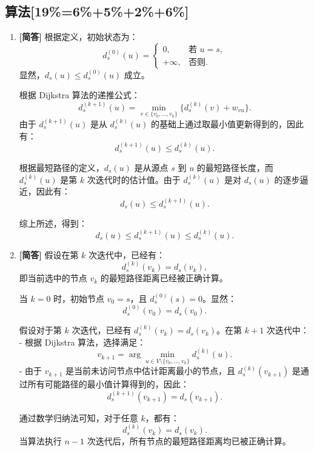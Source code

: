 \documentclass{article}
\begin{document}
\subsection{算法[19\%=6\%+5\%+2\%+6\%]}

\begin{enumerate}[label=(\alph*), start=3]
    \item \textbf{[简答]} %
    根据定义，初始状态为：
    \[
    d_s^{(0)}(u) =
    \begin{cases}
    	0, & \text{若 } u = s, \\
    	+\infty, & \text{否则}.
    \end{cases}
    \]
    显然，\( d_s(u) \leq d_s^{(0)}(u) \) 成立。
    
    根据 Dijkstra 算法的递推公式：
    \[
    d_s^{(k+1)}(u) = \min_{v \in \{v_0, \dots, v_k\}} \{ d_s^{(k)}(v) + w_{vu} \}.
    \]
    由于 \( d_s^{(k+1)}(u) \) 是从 \( d_s^{(k)}(u) \) 的基础上通过取最小值更新得到的，因此有：
    \[
    d_s^{(k+1)}(u) \leq d_s^{(k)}(u).
    \]
    
    根据最短路径的定义，\( d_s(u) \) 是从源点 \( s \) 到 \( u \) 的最短路径长度，而 \( d_s^{(k)}(u) \) 是第 \( k \) 次迭代时的估计值。由于 \( d_s^{(k)}(u) \) 是对 \( d_s(u) \) 的逐步逼近，因此有：
    \[
    d_s(u) \leq d_s^{(k+1)}(u).
    \]
    
    综上所述，得到：
    \[
    d_s(u) \leq d_s^{(k+1)}(u) \leq d_s^{(k)}(u).
    \]
    \item \textbf{[简答]} %
    假设在第 \( k \) 次迭代中，已经有：
    \[
    d_s^{(k)}(v_k) = d_s(v_k),
    \]
    即当前选中的节点 \( v_k \) 的最短路径距离已经被正确计算。
    
    当 \( k = 0 \) 时，初始节点 \( v_0 = s \)，且 \( d_s^{(0)}(s) = 0 \)。显然：
    \[
    d_s^{(0)}(v_0) = d_s(v_0).
    \]
    
    假设对于第 \( k \) 次迭代，已经有 \( d_s^{(k)}(v_k) = d_s(v_k) \)。在第 \( k+1 \) 次迭代中：
    - 根据 Dijkstra 算法，选择满足：
    \[
    v_{k+1} = \arg\min_{u \in V \setminus \{v_0, \dots, v_k\}} d_s^{(k)}(u).
    \]
    - 由于 \( v_{k+1} \) 是当前未访问节点中估计距离最小的节点，且 \( d_s^{(k)}(v_{k+1}) \) 是通过所有可能路径的最小值计算得到的，因此：
    \[
    d_s^{(k+1)}(v_{k+1}) = d_s(v_{k+1}).
    \]
    
    通过数学归纳法可知，对于任意 \( k \)，都有：
    \[
    d_s^{(k)}(v_k) = d_s(v_k).
    \]
    当算法执行 \( n-1 \) 次迭代后，所有节点的最短路径距离均已被正确计算。
    
\end{enumerate}
\end{document}
